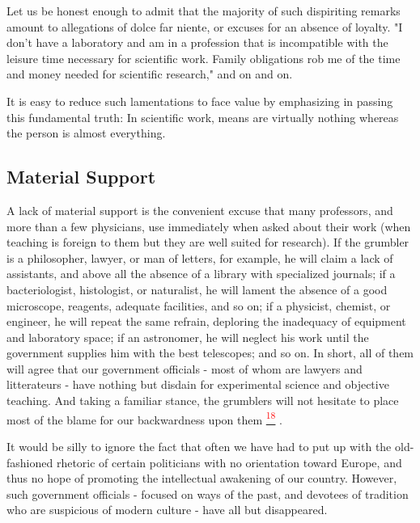 \documentclass{article}
\newcommand{\noteref}[1]{%
 \hypertarget{ref:#1}{}%
 \hyperlink{note:#1}{\textsuperscript{\textcolor{red}{#1}}}%
}
\begin{document}
Let us be honest enough to admit that the majority of such dispiriting remarks amount to allegations of dolce far niente, or excuses for an absence of loyalty. "I don’t have a laboratory and am in a profession that is incompatible with the leisure time necessary for scientific work. Family obligations rob me of the time and money needed for scientific research," and on and on.

It is easy to reduce such lamentations to face value by emphasizing in passing this fundamental truth: In scientific work, means are virtually nothing whereas the person is almost everything.

\subsection*{Material Support}

A lack of material support is the convenient excuse that many professors, and more than a few physicians, use immediately when asked about their work (when teaching is foreign to them but they are well suited for research). If the grumbler is a philosopher, lawyer, or man of letters, for example, he will claim a lack of assistants, and above all the absence of a library with specialized journals; if a bacteriologist, histologist, or naturalist, he will lament the absence of a good microscope, reagents, adequate facilities, and so on; if a physicist, chemist, or engineer, he will repeat the same refrain, deploring the inadequacy of equipment and laboratory space; if an astronomer, he will neglect his work until the government supplies him with the best telescopes; and so on. In short, all of them will agree that our government officials - most of whom are lawyers and litterateurs - have nothing but disdain for experimental science and objective teaching. And taking a familiar stance, the grumblers will not hesitate to place most of the blame for our backwardness upon them\noteref{18}.

It would be silly to ignore the fact that often we have had to put up with the old-fashioned rhetoric of certain politicians with no orientation toward Europe, and thus no hope of promoting the intellectual awakening of our country. However, such government officials - focused on ways of the past, and devotees of tradition who are suspicious of modern culture - have all but disappeared.
\end{document}
